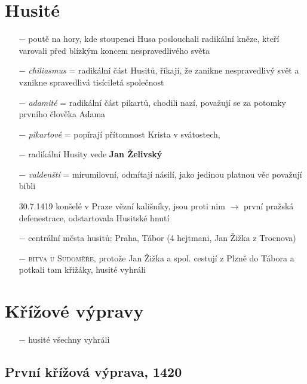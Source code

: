 \documentclass{article}
\begin{document}
\section*{Husité}
\begin{itemize}
    \vspace{-0.5em}
    \setlength\itemsep{0.15em}
    \item[$-$] poutě na hory, kde stoupenci Husa poslouchali radikální kněze, kteří varovali před blízkým koncem nespravedlivého světa
    \item[$-$] \textit{chiliasmus} = radikální část Husitů, říkají, že zanikne nespravedlivý svět a vznikne spravedlivá tisíciletá společnost
    \item[$-$] \textit{adamité} = radikální část pikartů, chodili nazí, považují se za potomky prvního člověka Adama
    \item[$-$] \textit{pikartové} = popírají přítomnost Krista v svátostech,  
    \item[$-$] radikální Husity vede \textbf{Jan Želivský}
    \item[$-$] \textit{valdenští} = mírumilovní, odmítají násilí, jako jedinou platnou věc považují bibli
    \item[30.7.1419] konšelé v Praze vězní kališníky, jsou proti nim $\rightarrow$ první pražská defenestrace, odstartovala Husitské hnutí
    \item[$-$] centrální města husitů: Praha, Tábor (4 hejtmani, Jan Žižka z Trocnova)
    \item[$-$] \textsc{bitva u Sudoměře}, protože Jan Žižka a spol. cestují z Plzně do Tábora a potkali tam křižáky, husité vyhráli
\end{itemize}


\section*{Křížové výpravy}
\begin{itemize}
    \vspace{-0.5em}
    \setlength\itemsep{0.15em}
    \item[$-$] husité všechny vyhráli
\end{itemize}

\subsection*{První křížová výprava, 1420}
\end{document}
